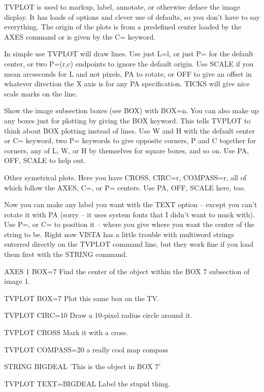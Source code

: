 TVPLOT is used to markup, label, annotate, or otherwise deface the image
display.  It has loads of options and clever use of defaults, so you don't
have to say everything.  The origin of the plots is from a predefined
center loaded by the AXES command or is given by the C= keyword.

In simple use TVPLOT will draw lines.  Use just L=l, or just P= for the
default center, or two P=(r,c) endpoints to ignore the default origin.  Use
SCALE if you mean arcseconds for L and not pixels, PA to rotate, or OFF to
give an offset in whatever direction the X axis is for any PA
specification.  TICKS will give nice scale marks on the line.

Show the image subsection boxes (see BOX) with BOX=n.  You can also make up
any boxes just for plotting by giving the BOX keyword.  This tells TVPLOT
to think about BOX plotting instead of lines.  Use W and H with the default
center or C= keyword, two P= keywords to give opposite corners, P and C
together for corners, any of L, W, or H by themselves for square boxes, and
so on.  Use PA, OFF, SCALE to help out.

Other symetrical plots.  Here you have CROSS, CIRC=r, COMPASS=r, all of
which follow the AXES, C=, or P= centers. Use PA, OFF, SCALE here, too.

Now you can make any label you want with the TEXT option -- except you can't
rotate it with PA (sorry -- it uses system fonts that I didn't want to muck
with).  Use P=, or C= to position it -- where you give where you want the
center of the string to be.  Right now VISTA has a little trouble with
multiword strings enterred directly on the TVPLOT command line, but they
work fine if you load them first with the STRING command.

\begin{example}
  \item[AXES 1 BOX=7\hfill]{Find the center of the object within
       the BOX 7 subsection of image 1.}
  \item[TVPLOT BOX=7\hfill]{Plot this same box on the TV.}
  \item[TVPLOT CIRC=10\hfill]{Draw a 10-pixel radius circle around it.}
  \item[TVPLOT CROSS\hfill]{Mark it with a cross.}
  \item[TVPLOT COMPASS=20\hfill]{a really cool map compass}
  \item[STRING BIGDEAL  'This is the object in BOX 7']{}
  \item[TVPLOT TEXT=BIGDEAL\hfill]{Label the stupid thing.}
\end{example}

